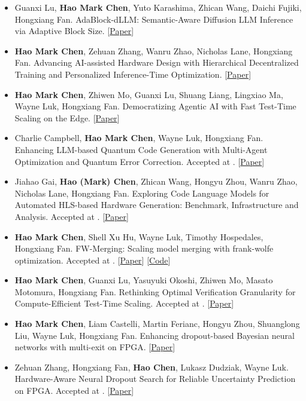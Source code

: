 \begin{itemize}
        \item Guanxi Lu, \textbf{Hao Mark Chen}, Yuto Karashima, Zhican Wang, Daichi Fujiki, Hongxiang Fan. AdaBlock-dLLM: Semantic-Aware Diffusion LLM Inference via Adaptive Block Size. [\href{https://arxiv.org/pdf/2509.26432}{Paper}]
        \item \textbf{Hao Mark Chen}, Zehuan Zhang, Wanru Zhao, Nicholas Lane, Hongxiang Fan. Advancing AI-assisted Hardware Design with Hierarchical Decentralized Training and Personalized Inference-Time Optimization. [\href{https://arxiv.org/pdf/2506.00002?}{Paper}]
        \item \textbf{Hao Mark Chen}, Zhiwen Mo, Guanxi Lu, Shuang Liang, Lingxiao Ma, Wayne Luk, Hongxiang Fan. Democratizing Agentic AI with Fast Test-Time Scaling on the Edge. [\href{https://arxiv.org/pdf/2509.00195}{Paper}]
        \item Charlie Campbell, \textbf{Hao Mark Chen}, Wayne Luk, Hongxiang Fan. Enhancing LLM-based Quantum Code Generation with Multi-Agent Optimization and Quantum Error Correction. Accepted at \DAC[2025]. [\href{https://drive.google.com/file/d/1ownLmdFwH-5vJYLNzsuTtJjMCLPrPl8u/view}{Paper}]
        \item Jiahao Gai, \textbf{Hao (Mark) Chen}, Zhican Wang, Hongyu Zhou, Wanru Zhao, Nicholas Lane, Hongxiang Fan. Exploring Code Language Models for Automated HLS-based Hardware Generation: Benchmark, Infrastructure and Analysis. Accepted at \ASPDAC[2025]. [\href{https://dl.acm.org/doi/pdf/10.1145/3658617.3697616}{Paper}]
        \item \textbf{Hao Mark Chen}, Shell Xu Hu, Wayne Luk, Timothy Hospedales, Hongxiang Fan. FW-Merging: Scaling model merging with frank-wolfe optimization. Accepted at \ICCV[2025]. [\href{https://drive.google.com/file/d/1k7bGeHlr2ruaRclFuDNgZ6F--uevVsaN/view}{Paper}] [\href{https://github.com/hmarkc/FW-Merging}{Code}]
        \item \textbf{Hao Mark Chen}, Guanxi Lu, Yasuyuki Okoshi, Zhiwen Mo, Masato Motomura, Hongxiang Fan. Rethinking Optimal Verification Granularity for Compute-Efficient Test-Time Scaling. Accepted at \NeurIPS[2025]. [\href{https://arxiv.org/pdf/2505.11730}{Paper}]
        \item \textbf{Hao Mark Chen}, Liam Castelli, Martin Ferianc, Hongyu Zhou, Shuanglong Liu, Wayne Luk, Hongxiang Fan. Enhancing dropout-based Bayesian neural networks with multi-exit on FPGA. [\href{https://arxiv.org/pdf/2406.14593?}{Paper}]
        \item Zehuan Zhang, Hongxiang Fan, \textbf{Hao Chen}, Lukasz Dudziak, Wayne Luk. Hardware-Aware Neural Dropout Search for Reliable Uncertainty Prediction on FPGA. Accepted at \DAC[2024]. [\href{https://arxiv.org/pdf/2406.16198?}{Paper}]

\end{itemize}
